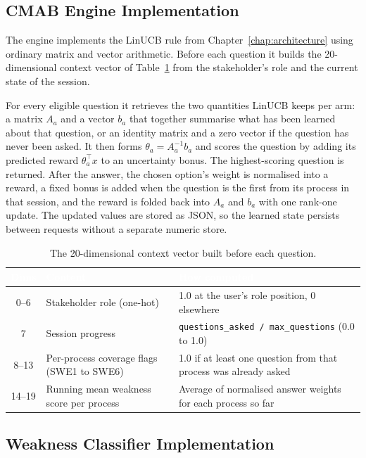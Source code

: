 \documentclass[a4paper, 12pt, oneside, openany, BCOR1cm,toc=chapterentrywithdots]{scrbook}
\newcommand{\thw}[1]{\textcolor{white}{\textbf{#1}}}
\begin{document}
\subsection{CMAB Engine Implementation}

The engine implements the LinUCB rule from Chapter~\ref{chap:architecture} using ordinary
matrix and vector arithmetic. Before each question it builds the 20-dimensional context vector
of Table~\ref{tab:context-vector} from the stakeholder's role and the current state of the
session.

For every eligible question it retrieves the two quantities LinUCB keeps per arm: a matrix
$A_a$ and a vector $b_a$ that together summarise what has been learned about that question, or
an identity matrix and a zero vector if the question has never been asked. It then forms
$\theta_a = A_a^{-1} b_a$ and scores the question by adding its predicted reward
$\theta_a^\top x$ to an uncertainty bonus. The highest-scoring question is returned. After the
answer, the chosen option's weight is normalised into a reward, a fixed bonus is added when the
question is the first from its process in that session, and the reward is folded back into
$A_a$ and $b_a$ with one rank-one update. The updated values are stored as JSON, so the learned
state persists between requests without a separate numeric store.

\begin{table}[h]
\centering
{}
\begin{tabular}{c p{4.3cm} p{6.2cm}}
\toprule
\rowcolor{green!55!black}
\thw{Dims} & \thw{Content} & \thw{How computed} \\
\midrule
0--6 & Stakeholder role (one-hot) & 1.0 at the user's role position, 0 elsewhere \\
7 & Session progress & \texttt{questions\_asked / max\_questions} (0.0 to 1.0) \\
8--13 & Per-process coverage flags (SWE1 to SWE6) & 1.0 if at least one question from that
process was already asked \\
14--19 & Running mean weakness score per process & Average of normalised answer weights for
each process so far \\
\bottomrule
\end{tabular}
\caption{The 20-dimensional context vector built before each question.}
\label{tab:context-vector}
\end{table}


\subsection{Weakness Classifier Implementation}
\end{document}
